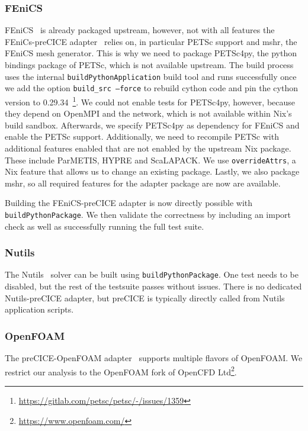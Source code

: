 \documentclass{eceasst}
\begin{document}
\subsubsection{FEniCS}

FEniCS~\cite{fenics} is already packaged upstream, however, not with all features the FEniCs-preCICE adapter~\cite{Rodenberg2021} relies on, in particular PETSc support and mshr, the FEniCS mesh generator.
This is why we need to package PETSc4py, the python bindings package of PETSc, which is not available upstream.
The build process uses the internal \texttt{buildPythonApplication} build tool and runs successfully once we add the option \texttt{build\_src --force} to rebuild cython code and pin the cython version to 0.29.34~\footnote{\url{https://gitlab.com/petsc/petsc/-/issues/1359}}.
We could not enable tests for PETSc4py, however, because they depend on OpenMPI and the network, which is not available within Nix's build sandbox.
Afterwards, we specify PETSc4py as dependency for FEniCS and enable the PETSc support.
Additionally, we need to recompile PETSc with additional features enabled that are not enabled by the upstream Nix package. These include ParMETIS, HYPRE and ScaLAPACK. We use \texttt{overrideAttrs}, a Nix feature that allows us to change an existing package.
Lastly, we also package mshr, so all required features for the adapter package are now are available.

Building the FEniCS-preCICE adapter is now directly possible with \texttt{buildPythonPackage}.
We then validate the correctness by including an import check as well as successfully running the full test suite.

\subsubsection{Nutils}

The Nutils~\cite{nutils} solver can be built using \texttt{buildPythonPackage}. One test needs to be disabled, but the rest of the testsuite passes without issues. There is no dedicated Nutils-preCICE adapter, but preCICE is typically directly called from Nutils application scripts.

\subsubsection{OpenFOAM}

The preCICE-OpenFOAM adapter~\cite{OpenFOAMpreCICE} supports multiple flavors of OpenFOAM. We restrict our analysis to the OpenFOAM fork of OpenCFD Ltd\footnote{\url{https://www.openfoam.com/}}.
\end{document}

